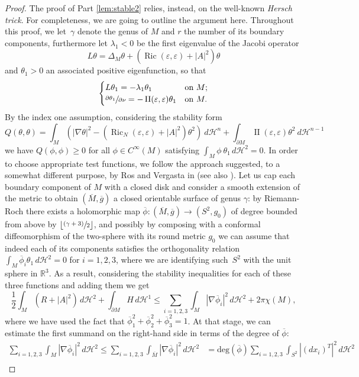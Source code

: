 \documentclass[JEP,XML,SOM,Unicode]{cedram}
\newcounter{cas}
\newcommand{\psfrac}[2]{\sfrac{(#1)}{#2}}
\DeclareMathOperator{\II}{II}
\DeclareMathOperator{\Ric}{Ric}
\theoremstyle{definition}
\newcommand{\R}{\mathbb{R}}
\newcommand{\h}{\mathscr{H}}
\newcommand{\rd}{\ d}
\let\eps\varepsilon
\let\epsilon\eps
\newcommand{\floor}[1]{\lfloor #1 \rfloor}
\begin{document}
\begin{proof}
The proof of Part \eqref{lem:stable2} relies, instead, on the well-known \emph{Hersch trick}. For completeness, we are going to outline the argument here.
Throughout this proof, we let~$\gamma$ denote the genus of $M$ and $r$ the number of its boundary components, furthermore let $\lambda_1<0$ be the first eigenvalue of the Jacobi operator
\[
L\theta=\Delta_{M}\theta + (\Ric(\epsilon,\epsilon)+|A|^2)\theta
\]
and $\theta_1>0$ an associated positive eigenfunction, so that
\[
\begin{cases}
L\theta_1=-\lambda_1\theta_1 & \text{on} \ M;\\
\sfrac{\partial\theta_1}{\partial\nu} =-\II(\epsilon,\epsilon)\theta_1 & \text{on} \ M.
\end{cases}
\]
By the index one assumption, considering the stability form
\[
Q(\theta,\theta)= \int_{M} \left(|\nabla \theta|^2 - (\Ric_N(\epsilon,\epsilon) + |A|^2)\theta^2 \right)\rd\h^{n} + \int_{\partial M}\II(\epsilon,\epsilon)\theta^2 \rd \h^{n-1}
\]
we have $Q(\phi,\phi)\geq 0$ for all $\phi\in C^{\infty}(M)$ satisfying $\int_M \phi ~\theta_1\,d\h^2=0$. In order to choose appropriate test functions, we follow the approach suggested, to a somewhat different purpose, by Ros and Vergasta in \cite{RV95} (see also \cite[Th.\,5.1]{CFP14}). Let us cap each boundary component of $M$ with a closed disk and consider a smooth extension of the metric to obtain $(\overline{M},\overline{g})$ a closed orientable surface of genus $\gamma$: by Riemann-Roch there exists a holomorphic map $\overline{\phi}:(\overline{M},\overline{g})\to(S^2,g_0)$ of degree bounded from above by $\floor{\psfrac{\gamma+3}{2}}$, and possibly by composing with a conformal diffeomorphism of the two-sphere with its round metric $g_0$ we can assume that indeed each of its components satisfies the orthogonality relation $\int_M \overline{\phi}_i \theta_1\,d\h^2=0$ for $i=1,2,3$, where we are identifying such~$S^2$ with the unit sphere in $\R^3$. As a result, considering the stability inequalities for each of these three functions and adding them we get
\[
\frac{1}{2}\int_{M}(R+|A|^2)\,d\h^2+\int_{\partial M}H\,d\h^1\leq \sum_{i=1,2,3} \int_M |\nabla\overline{\phi}_i|^2\,d\h^2+ 2\pi\chi(M),
\]
where we have used the fact that $\overline{\phi}^2_1+\overline{\phi}^2_2+\overline{\phi}^2_3=1$. At that stage, we can estimate the first summand on the right-hand side in terms of the degree of $\overline{\phi}$:
\begin{align*}
\sum_{i=1,2,3} \int_M |\nabla\overline{\phi}_i|^2\,d\h^2\leq \sum_{i=1,2,3} \int_{\overline{M}} |\nabla\overline{\phi}_i|^2\,d\h^2&=\text{deg}(\overline{\phi})\sum_{i=1,2,3}\int_{S^2}|(d x_i)^T|^2\,d\h^2\\

\end{align*}
\end{proof}
\end{document}
